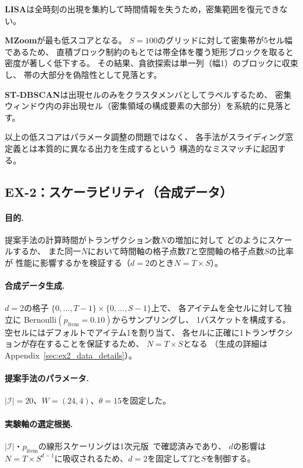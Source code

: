 \textbf{LISA}は全時刻の出現を集約して時間情報を失うため，密集範囲を復元できない。

\textbf{MZoom}が最も低スコアとなる。
$S{=}100$のグリッドに対して密集帯が5セル幅であるため、
直積ブロック制約のもとでは帯全体を覆う矩形ブロックを取ると密度が著しく低下する。
その結果、貪欲探索は単一列（幅1）のブロックに収束し、
帯の大部分を偽陰性として見落とす。

\textbf{ST-DBSCAN}は出現セルのみをクラスタメンバとしてラベルするため、
密集ウィンドウ内の非出現セル（密集領域の構成要素の大部分）を系統的に見落とす。

以上の低スコアはパラメータ調整の問題ではなく、
各手法がスライディング窓定義とは本質的に異なる出力を生成するという
構造的なミスマッチに起因する。

\subsection{EX-2：スケーラビリティ（合成データ）}
\label{sec:ex2}

\paragraph{目的.}
提案手法の計算時間がトランザクション数$N$の増加に対して
どのようにスケールするか、
また同一$N$において時間軸の格子点数$T$と空間軸の格子点数$S$の比率が
性能に影響するかを検証する（$d=2$のとき$N = T \times S$）。

\paragraph{合成データ生成.}
$d = 2$の格子
$\{0,\ldots,T{-}1\} \times \{0,\ldots,S{-}1\}$上で、
各アイテムを全セルに対して独立に
Bernoulli$(p_{\mathrm{item}}{=}0.10)$からサンプリングし、
1バスケットを構成する。
空セルにはデフォルトでアイテム1を割り当て、
各セルに正確に1トランザクションが存在することを保証するため、
$N = T \times S$となる
（生成の詳細はAppendix~\ref{sec:ex2_data_details}）。

\paragraph{提案手法のパラメータ.}
$|\mathcal{I}| = 20$、$W = (24, 4)$、$\theta = 15$を固定した。

\paragraph{実験軸の選定根拠.}
$|\mathcal{I}|$・$p_{\mathrm{item}}$の線形スケーリングは1次元版~\cite{aprioriwindow}で確認済みであり、
$d$の影響は$N = T \times S^{d-1}$に吸収されるため、$d = 2$を固定して$T$と$S$を制御する。

